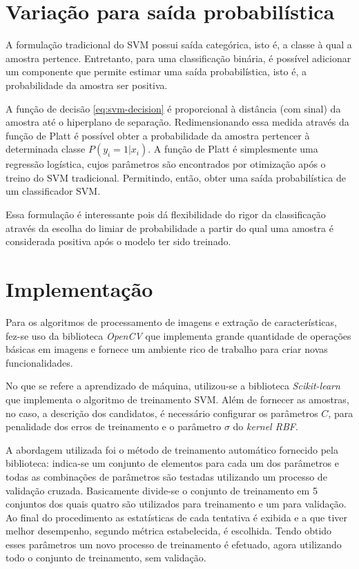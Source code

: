 \section{Variação para saída probabilística}
\label{sec:svm-probabilistic}
A formulação tradicional do SVM possui saída categórica, isto é, a classe à qual a amostra pertence. Entretanto, para uma classificação binária, é possível adicionar um componente que permite estimar uma saída probabilística, isto é, a probabilidade da amostra ser positiva.

A função de decisão \eqref{eq:svm-decision} é proporcional à distância (com sinal) da amostra até o hiperplano de separação. Redimensionando essa medida através da função de Platt \cite{svmProbabilisticOutput} é possível obter a probabilidade da amostra pertencer à determinada classe $P(y_i=1 | x_i)$. A função de Platt é simplesmente uma regressão logística, cujos parâmetros são encontrados por otimização após o treino do SVM tradicional. Permitindo, então, obter uma saída probabilística de um classificador SVM.

Essa formulação é interessante pois dá flexibilidade do rigor da classificação através da escolha do limiar de probabilidade a partir do qual uma amostra é considerada positiva após o modelo ter sido treinado.

\section{Implementação}
Para os algoritmos de processamento de imagens e extração de características, fez-se uso da biblioteca \textit{OpenCV} que implementa grande quantidade de operações básicas em imagens e fornece um ambiente rico de trabalho para criar novas funcionalidades.

No que se refere a aprendizado de máquina, utilizou-se a biblioteca \textit{Scikit-learn} \cite{scikit-learn} que implementa o algoritmo de treinamento SVM. Além de fornecer as amostras, no caso, a descrição dos candidatos, é necessário configurar os parâmetros $C$, para penalidade dos erros de treinamento e o parâmetro $\sigma$ do \textit{kernel RBF}. 

A abordagem utilizada foi o método de treinamento automático fornecido pela biblioteca: indica-se um conjunto de elementos para cada um dos parâmetros e todas as combinações de parâmetros são testadas utilizando um processo de validação cruzada. Basicamente divide-se o conjunto de treinamento em 5 conjuntos dos quais quatro são utilizados para treinamento e um para validação. Ao final do procedimento as estatísticas de cada tentativa é exibida e a que tiver melhor desempenho, segundo métrica estabelecida, é escolhida. Tendo obtido esses parâmetros um novo processo de treinamento é efetuado, agora utilizando todo o conjunto de treinamento, sem validação.

